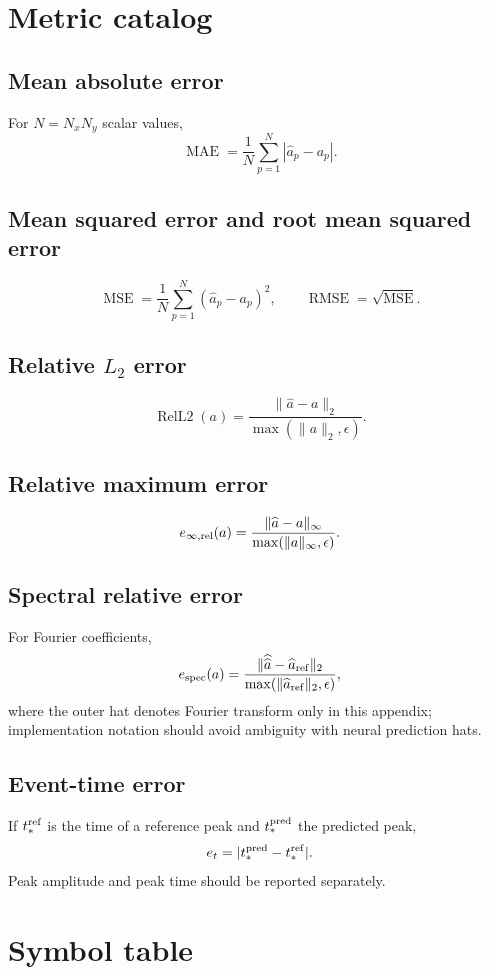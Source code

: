\documentclass[11pt]{article}
\newcommand{\MSE}{\operatorname{MSE}}
\newcommand{\RMSE}{\operatorname{RMSE}}
\newcommand{\MAE}{\operatorname{MAE}}
\newcommand{\RelLtwo}{\operatorname{RelL2}}
\begin{document}
\section{Metric catalog}
\label{app:metrics}

\subsection{Mean absolute error}
For $N=N_xN_y$ scalar values,
\[
\MAE=\frac1N\sum_{p=1}^{N}|\widehat a_p-a_p|.
\]

\subsection{Mean squared error and root mean squared error}
\[
\MSE=\frac1N\sum_{p=1}^{N}(\widehat a_p-a_p)^2,
\qquad
\RMSE=\sqrt{\MSE}.
\]

\subsection{Relative $L_2$ error}
\[
\RelLtwo(a)=\frac{\|\widehat a-a\|_2}{\max(\|a\|_2,\epsilon)}.
\]

\subsection{Relative maximum error}
\[
e_{\infty,\rm rel}(a)=
\frac{\|\widehat a-a\|_\infty}{\max(\|a\|_\infty,\epsilon)}.
\]

\subsection{Spectral relative error}
For Fourier coefficients,
\[
e_{\rm spec}(a)=
\frac{\|\widehat{\widehat a}-\widehat a_{\rm ref}\|_2}
{\max(\|\widehat a_{\rm ref}\|_2,\epsilon)},
\]
where the outer hat denotes Fourier transform only in this appendix; implementation notation should avoid ambiguity with neural prediction hats.

\subsection{Event-time error}
If $t_*^{\rm ref}$ is the time of a reference peak and $t_*^{\rm pred}$ the predicted peak,
\[
e_t=|t_*^{\rm pred}-t_*^{\rm ref}|.
\]
Peak amplitude and peak time should be reported separately.

\section{Symbol table}
\label{app:symbols}
\end{document}
